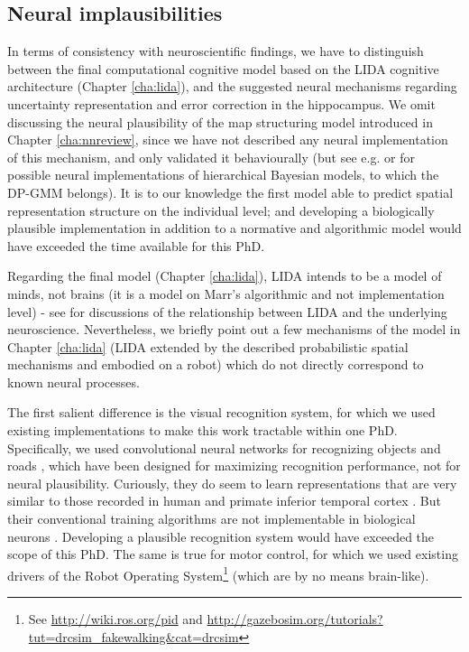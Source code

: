 \subsection{Neural implausibilities}

In terms of consistency with neuroscientific findings, we have to distinguish between the final computational cognitive model based on the LIDA cognitive architecture (Chapter \ref{cha:lida}), and the suggested neural mechanisms regarding uncertainty representation and error correction in the hippocampus. We omit discussing the neural plausibility of the map structuring model introduced in Chapter \ref{cha:nnreview}, since we have not described any neural implementation of this mechanism, and only validated it behaviourally (but see e.g. \citep{shi2009neural} or \citep{sanborn2015types} for possible neural implementations of hierarchical Bayesian models, to which the DP-GMM belongs). It is to our knowledge the first model able to predict spatial representation structure on the individual level; and developing a biologically plausible implementation in addition to a normative and algorithmic model would have exceeded the time available for this PhD.

Regarding the final model (Chapter \ref{cha:lida}), LIDA intends to be a model of minds, not brains (it is a model on Marr's algorithmic and not implementation level) - see \citep{franklin2012global, franklin2013lida} for discussions of the relationship between LIDA and the underlying neuroscience. Nevertheless, we briefly point out a few mechanisms of the model in Chapter \ref{cha:lida} (LIDA extended by the described probabilistic spatial mechanisms and embodied on a robot) which do not directly correspond to known neural processes. 

The first salient difference is the visual recognition system, for which we used existing implementations to make this work tractable within one PhD. Specifically, we used convolutional neural networks for recognizing objects \citep{szegedy2014going} and roads \citep{brust2015convolutional}, which have been designed for maximizing recognition performance, not for neural plausibility. Curiously, they do seem to learn representations that are very similar to those recorded in human and primate inferior temporal cortex \citep{khaligh2014deep, yamins2013hierarchical}. But their conventional training algorithms are not implementable in biological neurons \citep{stork1989backpropagation, bengio2015towards}. Developing a plausible recognition system would have exceeded the scope of this PhD. The same is true for motor control, for which we used existing drivers of the Robot Operating System\footnote{See \url{http://wiki.ros.org/pid} and \url{http://gazebosim.org/tutorials?tut=drcsim_fakewalking&cat=drcsim}} (which are by no means brain-like).


